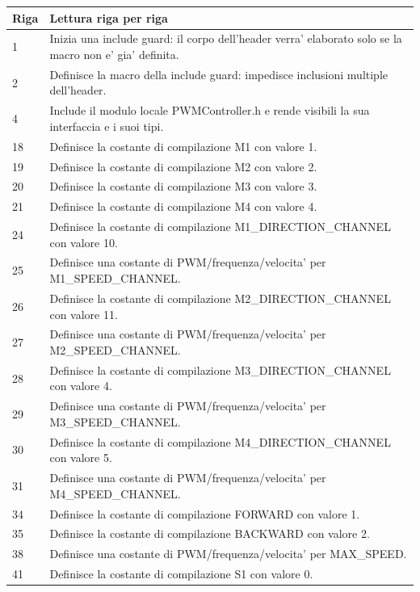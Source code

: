 \documentclass[11pt,a4paper]{article}
\begin{document}
\begin{longtable}{p{}p{}}
\toprule
\textbf{Riga} & \textbf{Lettura riga per riga} \\
\midrule
\endhead
1 & Inizia una include guard: il corpo dell'header verra' elaborato solo se la macro non e' gia' definita. \\
2 & Definisce la macro della include guard: impedisce inclusioni multiple dell'header. \\
4 & Include il modulo locale PWMController.h e rende visibili la sua interfaccia e i suoi tipi. \\
18 & Definisce la costante di compilazione M1 con valore 1. \\
19 & Definisce la costante di compilazione M2 con valore 2. \\
20 & Definisce la costante di compilazione M3 con valore 3. \\
21 & Definisce la costante di compilazione M4 con valore 4. \\
24 & Definisce la costante di compilazione M1\_\allowbreak{}DIRECTION\_\allowbreak{}CHANNEL con valore 10. \\
25 & Definisce una costante di PWM/frequenza/velocita' per M1\_\allowbreak{}SPEED\_\allowbreak{}CHANNEL. \\
26 & Definisce la costante di compilazione M2\_\allowbreak{}DIRECTION\_\allowbreak{}CHANNEL con valore 11. \\
27 & Definisce una costante di PWM/frequenza/velocita' per M2\_\allowbreak{}SPEED\_\allowbreak{}CHANNEL. \\
28 & Definisce la costante di compilazione M3\_\allowbreak{}DIRECTION\_\allowbreak{}CHANNEL con valore 4. \\
29 & Definisce una costante di PWM/frequenza/velocita' per M3\_\allowbreak{}SPEED\_\allowbreak{}CHANNEL. \\
30 & Definisce la costante di compilazione M4\_\allowbreak{}DIRECTION\_\allowbreak{}CHANNEL con valore 5. \\
31 & Definisce una costante di PWM/frequenza/velocita' per M4\_\allowbreak{}SPEED\_\allowbreak{}CHANNEL. \\
34 & Definisce la costante di compilazione FORWARD con valore 1. \\
35 & Definisce la costante di compilazione BACKWARD con valore 2. \\
38 & Definisce una costante di PWM/frequenza/velocita' per MAX\_\allowbreak{}SPEED. \\
41 & Definisce la costante di compilazione S1 con valore 0. \\

\end{longtable}
\end{document}
